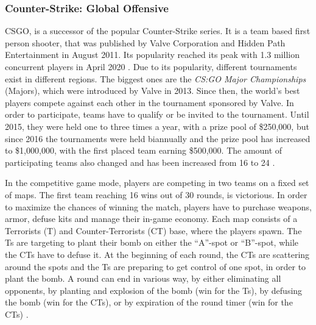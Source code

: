 \subsubsection{Counter-Strike: Global Offensive}
CSGO, is a successor of the popular Counter-Strike series. It is a team based first person shooter, that was published by Valve Corporation and Hidden Path Entertainment in August 2011. Its popularity reached its peak with 1.3 million concurrent players in April 2020 \cite{CounterS89:online}. Due to its popularity, different tournaments exist in different regions. The biggest ones are the \textit{CS:GO Major Championships} (Majors), which were introduced by Valve in 2013. Since then, the world's best players compete against each other in the tournament sponsored by Valve. In order to participate, teams have to qualify or be invited to the tournament. Until 2015, they were held one to three times a year, with a prize pool of \$250,000, but since 2016 the tournaments were held biannually and the prize pool has increased to \$1,000,000, with the first placed team earning \$500,000. The amount of participating teams also changed and has been increased from 16 to 24 \cite{CSGOMajo61:online}. 

In the competitive game mode, players are competing in two teams on a fixed set of maps. The first team reaching 16 wins out of 30 rounds, is victorious. In order to maximize the chances of winning the match, players have to purchase weapons, armor, defuse kits and manage their in-game economy. Each map consists of a Terrorists (T) and Counter-Terrorists (CT) base, where the players spawn. The Ts are targeting to plant their bomb on either the ``A''-spot or ``B''-spot, while the CTs have to defuse it. At the beginning of each round, the CTs are scattering around the spots and the Ts are preparing to get control of one spot, in order to plant the bomb. A round can end in various way, by either eliminating all opponents, by planting and explosion of the bomb (win for the Ts),  by defusing the bomb (win for the CTs), or by expiration of the round timer (win for the CTs) \cite{CounterS4:online}.

